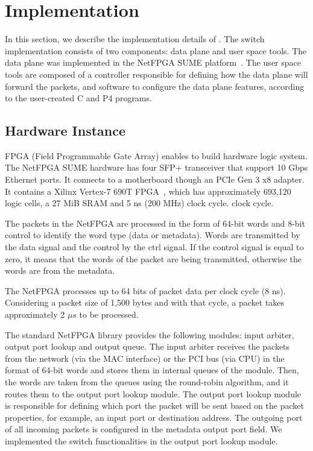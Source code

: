 \section{Implementation}
\label{sec:implementation}

In this section, we describe the implementation details of \system.
The switch implementation consists of two components: data plane and user space tools. 
The data plane was implemented in the NetFPGA SUME platform~\cite{SUME2014}.
The user space tools are composed of a controller responsible for defining how the data plane will forward the packets, and software to configure the data plane features, according to the user-created C and P4 programs.


\subsection{Hardware Instance}

FPGA (Field Programmable Gate Array) enables to build hardware logic system.
The NetFPGA SUME hardware has four SFP+ transceiver that support 10 Gbps Ethernet ports.
It connects to a motherboard though an PCIe Gen 3 x8 adapter.
It contains a Xilinx Vertex-7 690T FPGA~\cite{Virtex7},
which has approximately 693,120 logic cells, a 27 MiB SRAM and 5 ns (200 MHz) clock cycle.  
 clock cycle.

The packets in the NetFPGA are processed in the form of 64-bit words and 8-bit control to identify the word type (data or metadata). Words are transmitted by the data signal and the control by the ctrl signal. If the control signal is equal to zero, it means that the words of the packet are being transmitted, otherwise the words are from the metadata.

The NetFPGA processes up to 64 bits of packet data per clock cycle (8 ns). Considering a packet size of 1,500 bytes and with that cycle, a packet takes approximately 2 $\mu{s}$ to be processed.

The standard NetFPGA library provides the following modules: input arbiter, output port lookup and output queue. 
The input arbiter receives the packets from the network (via the MAC interface) or the PCI bus (via CPU) in the format of 64-bit words and stores them in internal queues of the module.
Then, the words are taken from the queues using the round-robin algorithm, and it routes them to
the output port lookup module. 
The output port lookup module is responsible for defining which port the packet will be sent based
on the packet properties, for example, an input port or destination address. 
The outgoing port of all incoming packets is configured in the metadata output port field.
We implemented the switch functionalities in the output port lookup module.

